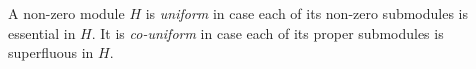 A non-zero module $H$ is \textit{uniform} in case each of its non-zero submodules is essential in $H$. It is \textit{co-uniform} in case each of its proper submodules is superfluous in $H$.
